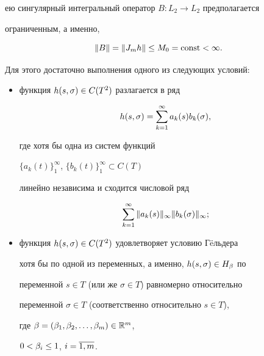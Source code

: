 ею сингулярный интегральный оператор $B:L_2\to L_2$ предполагается 


ограниченным, а именно,


\begin{equation}


\|B\| = \|J_mh\|\lea M_0 = \const < \infty.


\end{equation}


Для этого достаточно выполнения одного из следующих условий:


\begin{itemize}


\item[1)] функция $h(s,\sigma)\in C(T^2)$ разлагается в ряд


$$


h(s,\si) = \sum_{k=1}^\infty a_k(s)b_k(\si),


$$


где хотя бы одна из систем функций


$\{a_k(t)\}_1^\infty$, $\{b_k(t)\}_1^\infty\subset C(T)$


линейно независима и сходится числовой ряд


$$


\sum_{k=1}^\infty \|a_k(s)\|_\infty \|b_k(\si)\|_\infty;


$$


\item[2)] функция $h(s,\sigma)\in C(T^2)$ удовлетворяет условию Г\"eльдера 


хотя бы по одной из переменных, а именно, $h(s,\sigma)\in H_\beta$ по 


переменной $s\in T$ (или же $\sigma\in T$) равномерно относительно 


переменной $\sigma\in T$ (соответственно относительно $s\in T$), 


где $\beta = (\beta_1, \beta_2, \dotsc, \beta_m)\in \Bbb {R}^m$,


$0<\beta_i\le 1$, $i=\overline{1,m}$.


\end{itemize}








